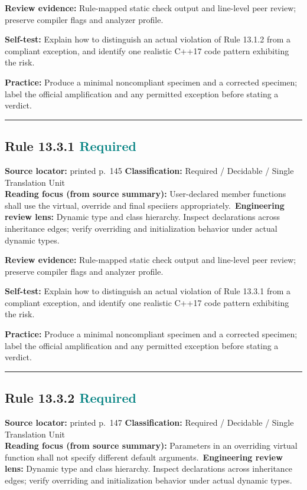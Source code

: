 \documentclass[10pt,letterpaper]{article}
\begin{document}
\textbf{Review evidence:} Rule-mapped static check output and line-level peer review; preserve compiler flags and analyzer profile.

\textbf{Self-test:} Explain how to distinguish an actual violation of Rule 13.1.2 from a compliant exception, and identify one realistic C++17 code pattern exhibiting the risk.\par
\textbf{Practice:} Produce a minimal noncompliant specimen and a corrected specimen; label the official amplification and any permitted exception before stating a verdict.
\smallskip\hrule\smallskip
\subsection*{Rule 13.3.1 \enspace \texorpdfstring{\small\textcolor{teal}{Required}}{Required}}
\noindent\textbf{Source locator:} printed p.~145 \quad\textbf{Classification:} Required / Decidable / Single Translation Unit\\
\textbf{Reading focus (from source summary):} User-declared member functions shall use the virtual, override and final speciiers appropriately.\
\textbf{Engineering review lens:} Dynamic type and class hierarchy. Inspect declarations across inheritance edges; verify overriding and initialization behavior under actual dynamic types.

\textbf{Review evidence:} Rule-mapped static check output and line-level peer review; preserve compiler flags and analyzer profile.

\textbf{Self-test:} Explain how to distinguish an actual violation of Rule 13.3.1 from a compliant exception, and identify one realistic C++17 code pattern exhibiting the risk.\par
\textbf{Practice:} Produce a minimal noncompliant specimen and a corrected specimen; label the official amplification and any permitted exception before stating a verdict.
\smallskip\hrule\smallskip
\subsection*{Rule 13.3.2 \enspace \texorpdfstring{\small\textcolor{teal}{Required}}{Required}}
\noindent\textbf{Source locator:} printed p.~147 \quad\textbf{Classification:} Required / Decidable / Single Translation Unit\\
\textbf{Reading focus (from source summary):} Parameters in an overriding virtual function shall not specify different default arguments.\
\textbf{Engineering review lens:} Dynamic type and class hierarchy. Inspect declarations across inheritance edges; verify overriding and initialization behavior under actual dynamic types.
\end{document}
